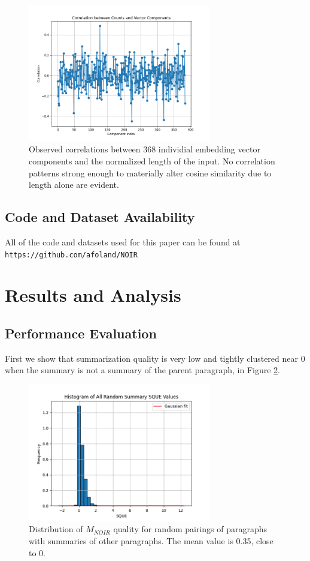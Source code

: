 \documentclass{article}
\begin{document}
{\begin{figure}
	\centering
	\includegraphics[height=6cm]{ntkl_cov.png}
	\caption{Observed correlations between 368 individial embedding vector components and the normalized length of the input.  No correlation patterns strong enough to materially alter cosine similarity due to length alone are evident.}
	\label{fig:corrnormlength}
\end{figure}


\subsection{Code and Dataset Availability}
All of the code and datasets used for this paper can be found at \texttt{https://github.com/afoland/NOIR}

\section{Results and Analysis}

\subsection{Performance Evaluation}

First we show that summarization quality is very low and tightly clustered near 0 when the summary is not a summary of the parent paragraph, in Figure \ref{fig:mNOIR_random}.

\begin{figure}
	\centering
	\includegraphics[height=6cm]{Histogram_of_All_Random_Summary_SQUE_Values.png}
	\caption{Distribution of $M_{NOIR}$ quality for random pairings of paragraphs with summaries of other paragraphs.  The mean value is 0.35, close to 0.}
	\label{fig:mNOIR_random}
\end{figure}

}
\end{document}
